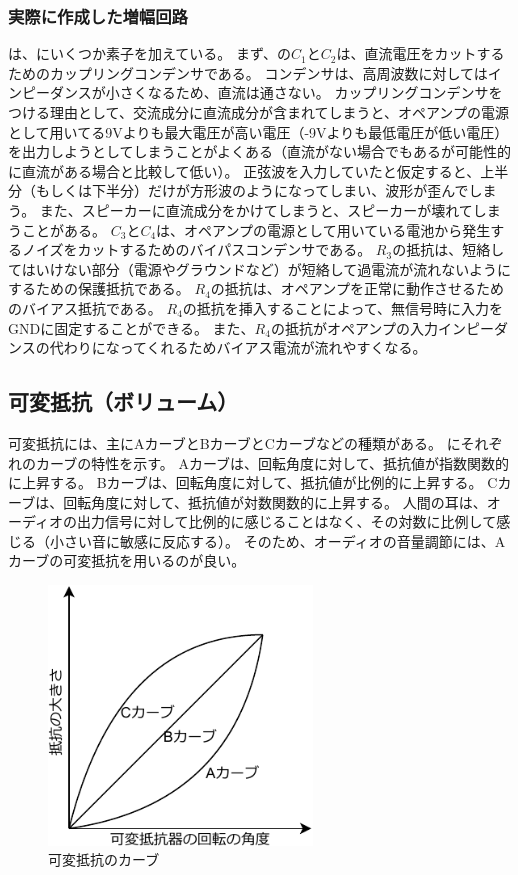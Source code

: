 \documentclass[report.tex]{subfiles}
\begin{document}
\subsubsection{実際に作成した増幅回路}

は、にいくつか素子を加えている。
まず、の\(C_1\)と\(C_2\)は、直流電圧をカットするためのカップリングコンデンサである。
コンデンサは、高周波数に対してはインピーダンスが小さくなるため、直流は通さない。
カップリングコンデンサをつける理由として、交流成分に直流成分が含まれてしまうと、オペアンプの電源として用いてる9Vよりも最大電圧が高い電圧（-9Vよりも最低電圧が低い電圧）を出力しようとしてしまうことがよくある（直流がない場合でもあるが可能性的に直流がある場合と比較して低い）。
正弦波を入力していたと仮定すると、上半分（もしくは下半分）だけが方形波のようになってしまい、波形が歪んでしまう。
また、スピーカーに直流成分をかけてしまうと、スピーカーが壊れてしまうことがある。
\(C_3\)と\(C_4\)は、オペアンプの電源として用いている電池から発生するノイズをカットするためのバイパスコンデンサである。
\(R_3\)の抵抗は、短絡してはいけない部分（電源やグラウンドなど）が短絡して過電流が流れないようにするための保護抵抗である。
\(R_4\)の抵抗は、オペアンプを正常に動作させるためのバイアス抵抗である。
\(R_4\)の抵抗を挿入することによって、無信号時に入力をGNDに固定することができる。
また、\(R_4\)の抵抗がオペアンプの入力インピーダンスの代わりになってくれるためバイアス電流が流れやすくなる。

\subsection{可変抵抗（ボリューム）}

可変抵抗には、主にAカーブとBカーブとCカーブなどの種類がある。
にそれぞれのカーブの特性を示す。
Aカーブは、回転角度に対して、抵抗値が指数関数的に上昇する。
Bカーブは、回転角度に対して、抵抗値が比例的に上昇する。
Cカーブは、回転角度に対して、抵抗値が対数関数的に上昇する。
人間の耳は、オーディオの出力信号に対して比例的に感じることはなく、その対数に比例して感じる（小さい音に敏感に反応する）。
そのため、オーディオの音量調節には、Aカーブの可変抵抗を用いるのが良い。

\begin{figure}[H]
	\centering
	\includegraphics[width=7cm]{fig/cabe.pdf}
	\caption{可変抵抗のカーブ}
	\label{fig:cabe}
\end{figure}
\end{document}
